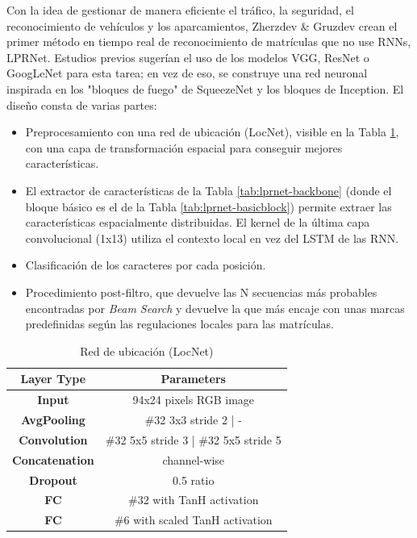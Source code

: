 \documentclass[12pt,a4paper,onecolumn,oneside]{report}
\begin{document}
Con la idea de gestionar de manera eficiente el tráfico, la seguridad, el reconocimiento de vehículos y los aparcamientos, Zherzdev \& Gruzdev \cite{zherzdev2018lprnetlicenseplaterecognition} crean el primer método en tiempo real de reconocimiento de matrículas que no use RNNs, LPRNet. Estudios previos sugerían el uso de los modelos VGG, ResNet o GoogLeNet para esta tarea; en vez de eso, se construye una red neuronal inspirada en los "bloques de fuego" de SqueezeNet y los bloques de Inception. El diseño consta de varias partes:
\begin{itemize}
    \item Preprocesamiento con una red de ubicación (LocNet), visible en la Tabla \ref{tab:locnet}, con una capa de transformación espacial  para conseguir mejores características.
    \item El extractor de características de la Tabla \ref{tab:lprnet-backbone} (donde el bloque básico es el de la Tabla \ref{tab:lprnet-basicblock}) permite extraer las características espacialmente distribuidas. El kernel de la última capa convolucional (1x13) utiliza el contexto local en vez del LSTM de las RNN.
    \item Clasificación de los caracteres por cada posición.
    \item Procedimiento post-filtro, que devuelve las N secuencias más probables encontradas por \textit{Beam Search} y devuelve la que más encaje con unas marcas predefinidas según las regulaciones locales para las matrículas.
\end{itemize}

\begin{table}[htb]
    \centering
    \begin{tabular}{|c|c|}
        \hline
        \textbf{Layer Type} & \textbf{Parameters}\\
        \hline
        \textbf{Input} & 94x24 pixels RGB image\\
        \hline
        \textbf{AvgPooling} & \#32 3x3 stride 2 | -\\
        \hline
        \textbf{Convolution} & \#32 5x5 stride 3 | \#32 5x5 stride 5\\
        \hline
        \textbf{Concatenation} & channel-wise\\
        \hline
        \textbf{Dropout} & 0.5 ratio\\
        \hline
        \textbf{FC} & \#32 with TanH activation\\
        \hline
        \textbf{FC} & \#6 with scaled TanH activation\\
        \hline
    \end{tabular}
    \caption{Red de ubicación (LocNet)}
    \label{tab:locnet}
\end{table}
\end{document}

